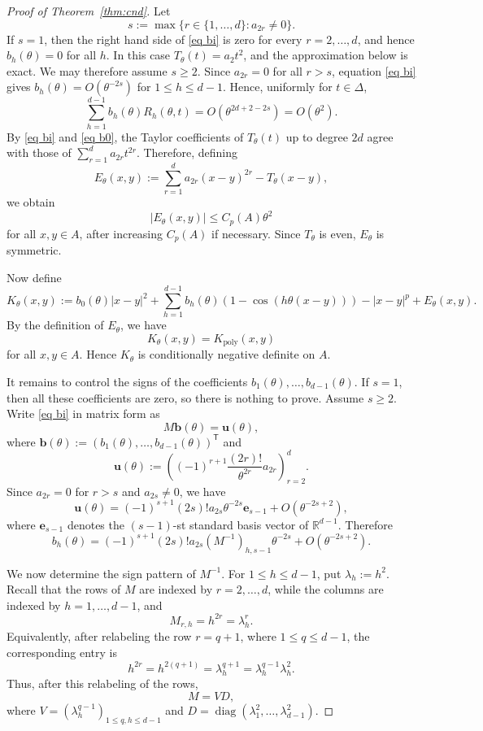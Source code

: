 \documentclass[11pt]{article}
\theoremstyle{definition}
\begin{document}
\begin{proof}[Proof of Theorem~\ref{thm:cnd}]
Let
\[
s:=\max\{r\in\{1,\dots,d\}:a_{2r}\ne0\}.
\]
If \(s=1\), then the right hand side of \eqref{eq bi} is zero for every \(r=2,\dots,d\), and hence \(b_h(\theta)=0\) for all \(h\). In this case \(T_\theta(t)=a_2t^2\), and the approximation below is exact. We may therefore assume \(s\ge2\). Since \(a_{2r}=0\) for all \(r>s\), equation \eqref{eq bi} gives
\(
b_h(\theta)=O(\theta^{-2s})
\)
for \(1\le h\le d-1\). Hence, uniformly for \(t\in\Delta\),
\[
\sum_{h=1}^{d-1}b_h(\theta)R_h(\theta,t)=O(\theta^{2d+2-2s})=O(\theta^2).
\]
By \eqref{eq bi} and \eqref{eq b0}, the Taylor coefficients of \(T_\theta(t)\) up to degree \(2d\) agree with those of \(\sum_{r=1}^d a_{2r}t^{2r}\). Therefore, defining
\[
E_\theta(x,y):=\sum_{r=1}^d a_{2r}(x-y)^{2r}-T_\theta(x-y),
\]
we obtain
\[
|E_\theta(x,y)|\le C_p(A)\theta^2
\]
for all \(x,y\in A\), after increasing \(C_p(A)\) if necessary. Since \(T_\theta\) is even, \(E_\theta\) is symmetric.

Now define
\[
K_\theta(x,y)
:=
b_0(\theta)|x-y|^2+\sum_{h=1}^{d-1}b_h(\theta)(1-\cos(h\theta(x-y)))-|x-y|^p+E_\theta(x,y).
\]
By the definition of \(E_\theta\), we have
\[
K_\theta(x,y)=K_{\mathrm{poly}}(x,y)
\]
for all \(x,y\in A\). Hence \(K_\theta\) is conditionally negative definite on \(A\).

It remains to control the signs of the coefficients \(b_1(\theta),\dots,b_{d-1}(\theta)\). If \(s=1\), then all these coefficients are zero, so there is nothing to prove. Assume \(s\ge2\). Write \eqref{eq bi} in matrix form as
\[
M\boldsymbol b(\theta)=\boldsymbol u(\theta),
\]
where
\(
\boldsymbol b(\theta):=(b_1(\theta),\dots,b_{d-1}(\theta))^{\mathsf T}
\)
and
\[
\boldsymbol u(\theta):=
\left((-1)^{r+1}\frac{(2r)!}{\theta^{2r}}a_{2r}\right)_{r=2}^d.
\]
Since \(a_{2r}=0\) for \(r>s\) and \(a_{2s}\ne0\), we have
\[
\boldsymbol u(\theta)
=
(-1)^{s+1}(2s)!a_{2s}\theta^{-2s}\boldsymbol e_{s-1}
+O(\theta^{-2s+2}),
\]
where \(\boldsymbol e_{s-1}\) denotes the \((s-1)\)-st standard basis vector of \(\mathbb R^{d-1}\). Therefore
\begin{equation}\label{eq bim}
b_h(\theta)
=
(-1)^{s+1}(2s)!a_{2s}(M^{-1})_{h,s-1}\theta^{-2s}
+O(\theta^{-2s+2}).
\end{equation}


We now determine the sign pattern of \(M^{-1}\). For \(1\le h\le d-1\), put
\(
\lambda_h:=h^2.
\)
Recall that the rows of \(M\) are indexed by \(r=2,\dots,d\), while the columns
are indexed by \(h=1,\dots,d-1\), and
\[
M_{r,h}=h^{2r}=\lambda_h^r.
\]
Equivalently, after relabeling the row \(r=q+1\), where \(1\le q\le d-1\), the
corresponding entry is
\[
h^{2r}=h^{2(q+1)}=\lambda_h^{q+1}=\lambda_h^{q-1}\lambda_h^2.
\]
Thus, after this relabeling of the rows,
\[
M=VD,
\]
where
\(
V=(\lambda_h^{q-1})_{1\le q,h\le d-1}\)
and
\(
D=\operatorname{diag}(\lambda_1^2,\dots,\lambda_{d-1}^2).
\)



\end{proof}
\end{document}
